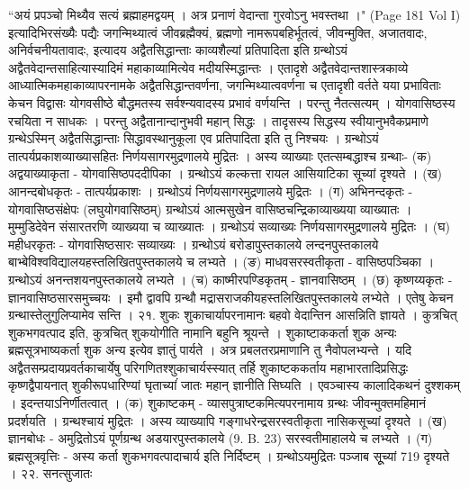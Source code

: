 ``अयं प्रपञ्चो मिथ्यैव सत्यं ब्रह्माहमद्वयम् । अत्र प्रनाणं वेदान्ता गुरवोऽनु भवस्तथा ।" (Page 181 Vol I) इत्यादिभिरसंख्यैः पद्यैः जगन्मिथ्यात्वं जीवब्रह्मैक्यं, ब्रह्मणो नामरूपबहिर्भूतत्वं, जीवन्मुक्ति, अजातवादः, अनिर्वचनीयतावादः, इत्यादय अद्वैतसिद्धान्ताः काव्यशैल्यां प्रतिपादिता इति ग्रन्थोऽयं अद्वैतवेदान्तसाहित्यास्यादिमं महाकाव्यामित्येव मदीयस्मिद्धान्तः । एतादृशे अद्वैतवेदान्तशास्त्रकाव्ये आध्यात्मिकमहाकाव्यापरनामके अद्वैतसिद्धान्तवर्णना, जगन्मिथ्यात्ववर्णना च एतादृशी वर्तते यया प्रभाविताः केचन विद्वासः योगवसीष्ठे बौद्धमतस्य सर्वश्न्यवादस्य प्रभावं वर्णयन्ति । परन्तु नैतत्सत्यम् । योगवासिष्ठस्य रचयिता न साधकः । परन्तु अद्वैतानान्दानुभवी महान् सिद्धः । तादृसस्य सिद्धस्य स्वीयानुभवैकप्रमाणे ग्रन्थेऽस्मिन् अद्वैतसिद्धान्ताः सिद्धावस्थानुकूला एव प्रतिपादिता इति तु निश्चयः । ग्रन्थोऽयं तात्पर्यप्रकाशव्याख्यासहितः निर्णयसागरमुद्रणालये मुद्रितः । अस्य व्याख्याः एतत्सम्बद्धाश्च ग्रन्थाः-
(क) अद्वयाख्याकृता - योगवासिष्ठपददीपिका । ग्रन्थोऽयं कल्कत्ता रायल आसियाटिका सूच्यां दृश्यते ।
(ख) आनन्दबोधकृतः - तात्पर्यप्रकाशः । ग्रन्थोऽयं निर्णयसागरमुद्रणालये मुद्रितः ।
(ग) अभिनन्दकृतः - योगवासिष्ठसंक्षेपः (लघुयोगवासिष्ठम्) ग्रन्थोऽयं आत्मसुखेन वासिष्ठचन्द्रिकाव्याख्यया व्याख्यातः । मुम्मुडिदेवेन संसारतरणि व्याख्यया च व्याख्यातः । ग्रन्थोऽयं सव्याख्यः निर्णयसागरमुद्रणालये मुद्रितः ।
(घ) महीधरकृतः - योगवासिष्ठसारः सव्याख्यः । ग्रन्थोऽयं बरोडापुस्तकालये लन्दनपुस्तकालये बाभ्बेविश्वविद्यालयहस्तलिखितपुस्तकालये च लभ्यते । 
(ङ) माधवसरस्वतीकृता - वासिष्ठपञ्चिका । ग्रन्थोऽयं अनन्तशयनपुस्तकालये लभ्यते ।
(च) काष्मीरपण्डिकृतम् - ज्ञानवासिष्ठम् ।
(छ) कृष्णय्यकृतः - ज्ञानवासिष्ठसारसमुच्चयः । इमौ द्वावपि ग्रन्थौ मद्रासराजकीयहस्तलिखितपुस्तकालये लभ्येते ।
एतेषु केचन ग्रन्थास्तेलुगुलिप्यामेव सन्ति ।
२१. शुकः
शुकाचार्यापरनामानः बहवो वेदान्तिन आसन्निति ज्ञायते । कुत्रचित् शुकभगवत्पाद इति, कुत्रचित् शुकयोगीति नामानि बहुनि श्रूयन्ते । शुकाष्टाककर्ता शुक अन्यः ब्रह्मसूत्रभाष्यकर्ता शुक अन्य इत्येव ज्ञातुं पार्यते । अत्र प्रबलतरप्रमाणानि तु नैवोपलभ्यन्ते । यदि अद्वैतसम्प्रदायप्रवर्तकाचार्येषु परिगणितश्शुकाचार्यस्स्यात् तर्हि शुकाष्टककर्ताय महाभारतादिप्रसिद्धः कृष्णद्वैपायनात् शुकीरूपधारिण्यां घृताच्यांं जातः महान् ज्ञानीति सिघ्यति । एवञ्चास्य कालादिकथनं दुश्शकम् । इदन्तयाऽनिर्णीतत्वात् ।
(क) शुकाष्टकम् - व्यासपुत्राष्टकमित्यपरनामाय ग्रन्थः जीवन्मुक्तमहिमानं प्रदर्शयति । ग्रन्थश्चायं मुद्रितः । अस्य व्याख्यापि गङ्गाधरेन्द्रसरस्वतीकृता नासिकसूच्यां दृश्यते ।
(ख) ज्ञानबोधः - अमुद्रितोऽयं पूर्णग्रन्थ अडयारपुस्तकालये (9. B. 23) सरस्वतीमाहालये च लभ्यते ।
(ग) ब्रह्मसूत्रवृत्तिः - अस्य कर्ता शुकभगवत्पादाचार्य इति निर्दिष्टम् । ग्रन्थोऽयमुद्रितः पञ्जाब सूूच्यां 719 दृश्यते ।
२२. सनत्सुजातः
